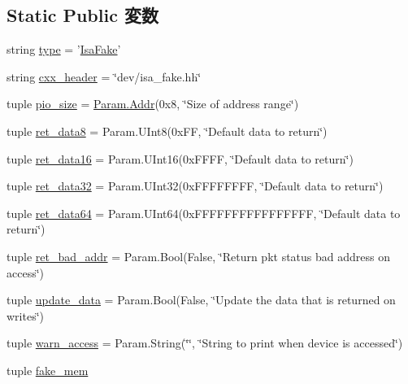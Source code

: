 \subsection*{Static Public 変数}
\begin{DoxyCompactItemize}
\item 
string \hyperlink{classDevice_1_1IsaFake_acce15679d830831b0bbe8ebc2a60b2ca}{type} = '\hyperlink{classDevice_1_1IsaFake}{IsaFake}'
\item 
string \hyperlink{classDevice_1_1IsaFake_a17da7064bc5c518791f0c891eff05fda}{cxx\_\-header} = \char`\"{}dev/isa\_\-fake.hh\char`\"{}
\item 
tuple \hyperlink{classDevice_1_1IsaFake_a33dedf79477cc33b1e0a82044d4d998c}{pio\_\-size} = \hyperlink{base_2types_8hh_af1bb03d6a4ee096394a6749f0a169232}{Param.Addr}(0x8, \char`\"{}Size of address range\char`\"{})
\item 
tuple \hyperlink{classDevice_1_1IsaFake_ab96c3091d240ed1b0dffe8dc116caae7}{ret\_\-data8} = Param.UInt8(0xFF, \char`\"{}Default data to return\char`\"{})
\item 
tuple \hyperlink{classDevice_1_1IsaFake_acd1683745d1a271a2424cb01d910d9ae}{ret\_\-data16} = Param.UInt16(0xFFFF, \char`\"{}Default data to return\char`\"{})
\item 
tuple \hyperlink{classDevice_1_1IsaFake_a34a8200017f783980e0cb2eb33332555}{ret\_\-data32} = Param.UInt32(0xFFFFFFFF, \char`\"{}Default data to return\char`\"{})
\item 
tuple \hyperlink{classDevice_1_1IsaFake_a12fa416b983e8963f54bfb92995b6707}{ret\_\-data64} = Param.UInt64(0xFFFFFFFFFFFFFFFF, \char`\"{}Default data to return\char`\"{})
\item 
tuple \hyperlink{classDevice_1_1IsaFake_afe050af66b0ed365423418f0163f2e10}{ret\_\-bad\_\-addr} = Param.Bool(False, \char`\"{}Return pkt status bad address on access\char`\"{})
\item 
tuple \hyperlink{classDevice_1_1IsaFake_aae00bf98162cfa3f52fce67187bd11ec}{update\_\-data} = Param.Bool(False, \char`\"{}Update the data that is returned on writes\char`\"{})
\item 
tuple \hyperlink{classDevice_1_1IsaFake_af7b2eb9eea2b844c9c2ebc0914c8ac6b}{warn\_\-access} = Param.String(\char`\"{}\char`\"{}, \char`\"{}String to print when device is accessed\char`\"{})
\item 
tuple \hyperlink{classDevice_1_1IsaFake_a1ee0c21db9d5a6f925abf0785935e82a}{fake\_\-mem}
\end{DoxyCompactItemize}


